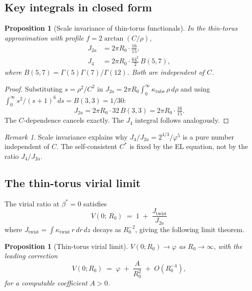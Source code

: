 \documentclass[11pt,a4paper]{article}
\newtheorem{proposition}[theorem]{Proposition}
\theoremstyle{definition}
\theoremstyle{remark}
\newtheorem{remark}[theorem]{Remark}
\newcommand{\vp}{\varphi}
\newcommand{\bst}{\beta^{*}}
\newcommand{\kk}{\kappa}
\begin{document}
\subsection{Key integrals in closed form}

\begin{proposition}[Scale invariance of thin-torus functionals]
\label{P3:prop:scale_inv}
In the thin-torus approximation with profile $f = 2\arctan(C/\rho)$,
\begin{align}
  J_{2a} &= 2\pi R_0 \cdot \frac{16}{15}, \label{P3:eq:Ja_exact}\\
  J_4    &= 2\pi R_0 \cdot \frac{64^2}{2}\,B(5,7), \label{P3:eq:J4_exact}
\end{align}
where $B(5,7) = \Gamma(5)\Gamma(7)/\Gamma(12)$.  Both are independent of $C$.
\end{proposition}

\begin{proof}
Substituting $s = \rho^2/C^2$ in $J_{2a} = 2\pi R_0\int_0^\infty \kk_{\mathrm{tube}}\,\rho\,d\rho$
and using $\int_0^\infty s^2/(s+1)^6\,ds = B(3,3) = 1/30$:
\[
  J_{2a} = 2\pi R_0\cdot 32\,B(3,3) = 2\pi R_0\cdot\tfrac{16}{15}.
\]
The $C$-dependence cancels exactly.  The $J_4$ integral follows analogously.
\end{proof}

\begin{remark}
\label{P3:rem:scale_invariance_explains}
Scale invariance explains why $J_4/J_{2a} = 2^{4/3}/\vp^5$ is a pure
number independent of $C$.  The self-consistent $C^*$ is fixed by the
EL equation, not by the ratio $J_4/J_{2a}$.
\end{remark}

\subsection{The thin-torus virial limit}

The virial ratio at $\bst=0$ satisfies
\begin{equation}
  V(0;\,R_0) \;=\; 1 \;+\; \frac{J_{\mathrm{twist}}}{J_{2a}}
  \label{P3:eq:V0_split}
\end{equation}
where $J_{\mathrm{twist}} = \int \kk_{\mathrm{twist}}\,r\,dr\,dz$
decays as $R_0^{-2}$, giving the following limit theorem.

\begin{proposition}[Thin-torus virial limit]
\label{P3:prop:virial_limit}
$V(0;R_0) \to \vp$ as $R_0\to\infty$, with the leading correction
\begin{equation}
  V(0;R_0) \;=\; \vp \;+\; \frac{A}{R_0^2} \;+\; O(R_0^{-4}),
  \label{P3:eq:V0_limit}
\end{equation}
for a computable coefficient $A > 0$.
\end{proposition}
\end{document}

